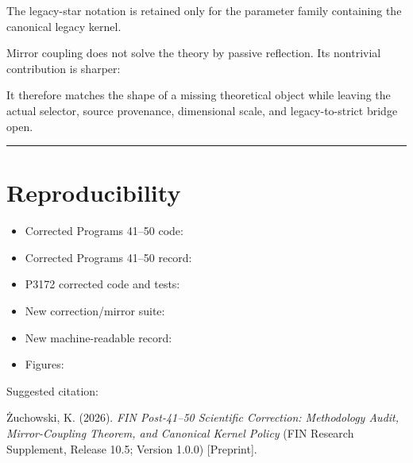 \documentclass[11pt,a4paper,openany]{report}
\begin{document}
The legacy-star notation is retained only for the parameter family containing the canonical legacy kernel.

Mirror coupling does not solve the theory by passive reflection. Its nontrivial contribution is sharper:

\begin{center}
\end{center}

It therefore matches the shape of a missing theoretical object while leaving the actual selector, source provenance, dimensional scale, and legacy-to-strict bridge open.

\par\medskip\hrule\medskip

\chapter{Reproducibility}

\begin{itemize}
\item 
Corrected Programs 41–50 code: 

\item 
Corrected Programs 41–50 record: 

\item 
P3172 corrected code and tests: 

\item 
New correction/\allowbreak{}mirror suite: 

\item 
New machine-readable record: 

\item 
Figures: 

\end{itemize}

Suggested citation:

Żuchowski, K. (2026). \emph{FIN Post-41–50 Scientific Correction: Methodology Audit, Mirror-Coupling Theorem, and Canonical Kernel Policy} (FIN Research Supplement, Release 10.5; Version 1.0.0) [Preprint].
\end{document}
